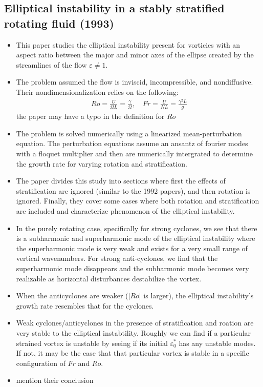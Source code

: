 \documentclass{article}
\begin{document}
    \subsection{Elliptical instability in a stably stratified rotating fluid
    (1993)}
    \begin{itemize}
       \item This paper studies the elliptical instability present for
       vorticies with an aspect ratio between the major and minor
       axes of the ellipse created by the streamlines of the flow 
       $\varepsilon \ne 1$. 
       \item The problem assumed the flow is inviscid, incompressible, and
       nondiffusive. Their nondimensionalization relies on the following:
       \begin{gather*}
            Ro = \frac{U}{\Omega L} = \frac{\gamma}{\Omega}, \quad Fr =
            \frac{U}{NL} = \frac{\gamma^2 L}{g}
       \end{gather*}
       {\color{red} the paper may have a typo in the definition for $Ro$}
       \item The problem is solved numerically using a linearized
       mean-perturbation equation. The perturbation equations assume an ansantz
       of fourier modes with a floquet multiplier and then are numerically
       intergrated to determine the growth rate for varying rotation and
       stratification. 
       \item The paper divides this study into sections where first the effects
       of stratification are ignored (similar to the 1992 papers), and then
       rotation is ignored. Finally, they cover some cases where both rotation
       and stratification are included and characterize phenomenon of the
       elliptical instability. 
       \item In the purely rotating case, specifically for strong cyclones, we see that there is a subharmonic and
       superharmonic mode of the elliptical instability where the superharmonic
       mode is very weak and exists for a very small range of vertical
       wavenumbers. For strong anti-cyclones, we find that the superharmonic mode
       disappears and the subharmonic mode becomes very realizable as
       horizontal disturbances destabilize the vortex. 
       \item When the anticyclones are weaker ($|Ro|$ is larger), the elliptical
       instability's growth rate resembles that for the cyclones. 
       \item Weak cyclones/anticyclones in the presence of stratification
       and roation are very stable to the elliptical instabtility. Roughly we
       can find if a particular strained vortex is unstable by seeing if its
       initial $\varepsilon_0^*$ has any unstable modes. If not, it may be the
       case that that particular vortex is stable in a specific configuration of
       $Fr$ and $Ro$. 
       \item {\color{red} mention their conclusion}
    \end{itemize}
\end{document}
